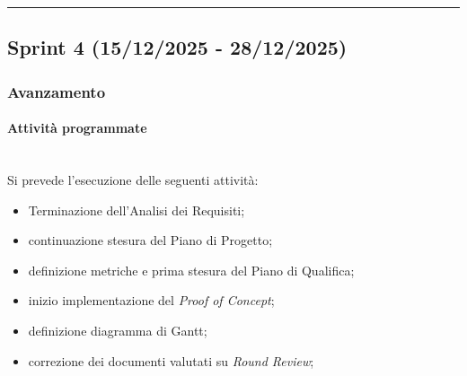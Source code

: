 \documentclass[10pt, letterpaper]{article}
\newcommand{\trisubsection}[1]{\paragraph{#1}\mbox{}\\}
\begin{document}
\vspace{1em}
\hrule
\vspace{1em}

\subsection{Sprint 4 (15/12/2025 - 28/12/2025)}
\subsubsection{Avanzamento}
\trisubsection{Attività programmate}
Si prevede l'esecuzione delle seguenti attività:
\begin{itemize}
    \item Terminazione dell'Analisi dei Requisiti;
    \item continuazione stesura del Piano di Progetto;
    \item definizione metriche e prima stesura del Piano di Qualifica;
    \item inizio implementazione del \textit{Proof of Concept};
    \item definizione diagramma di Gantt;
    \item correzione dei documenti valutati su \textit{Round Review};
\end{itemize}
\end{document}
